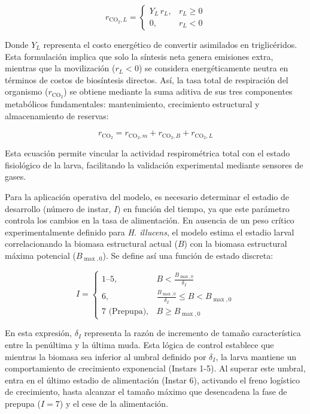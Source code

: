\begin{equation}
r_{\mathrm{CO_2},L} =
\begin{cases}
Y_L \, r_L, & r_L \geq 0 \\
0, & r_L < 0
\end{cases}
\label{eq:CO2L}
\end{equation}

Donde $Y_L$ representa el costo energético de convertir asimilados en triglicéridos. Esta 
formulación implica que solo la síntesis neta genera emisiones extra, mientras que la movilización 
($r_L < 0$) se considera energéticamente neutra en términos de costos de biosíntesis directos. 
Así, la tasa total de respiración del organismo ($r_{\mathrm{CO_2}}$) se obtiene mediante la suma 
aditiva de sus tres componentes metabólicos fundamentales: mantenimiento, crecimiento estructural 
y almacenamiento de reservas:

\begin{equation}
r_{\mathrm{CO_2}} = r_{\mathrm{CO_2},m} + r_{\mathrm{CO_2},B} + r_{\mathrm{CO_2},L}
\label{eq:CO2total}
\end{equation}

Esta ecuación permite vincular la actividad respirométrica total con el estado fisiológico de la larva, 
facilitando la validación experimental mediante sensores de gases.

Para la aplicación operativa del modelo, es necesario determinar el estadio de desarrollo 
(número de instar, $I$) en función del tiempo, ya que este parámetro controla los cambios 
en la tasa de alimentación. En ausencia de un peso crítico experimentalmente definido para 
\textit{H. illucens}, el modelo estima el estadio larval correlacionando la biomasa estructural 
actual ($B$) con la biomasa estructural máxima potencial ($B_{\max,0}$). Se define así una 
función de estado discreta:

\begin{equation}
I =
\begin{cases}
1\text{--}5, & B < \frac{B_{\max,0}}{\delta_I} \\[8pt]
6, & \frac{B_{\max,0}}{\delta_I} \leq B < B_{\max,0} \\[10pt]
7 \text{ (Prepupa)}, & B \geq B_{\max,0}
\end{cases}
\label{eq:instar}
\end{equation}

En esta expresión, $\delta_I$ representa la razón de incremento de tamaño característica entre 
la penúltima y la última muda. Esta lógica de control establece que mientras la biomasa sea 
inferior al umbral definido por $\delta_I$, la larva mantiene un comportamiento de crecimiento 
exponencial (Instars 1-5). Al superar este umbral, entra en el último estadio de alimentación 
(Instar 6), activando el freno logístico de crecimiento, hasta alcanzar el tamaño máximo que 
desencadena la fase de prepupa ($I=7$) y el cese de la alimentación.

